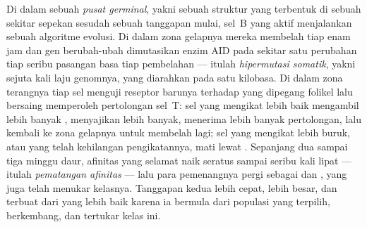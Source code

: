\begin{definition}\label{def:b3:adaptive-immunity:germinal-centre}
Di dalam sebuah \emph{pusat germinal}, yakni sebuah struktur yang terbentuk di
sebuah  sekitar sepekan sesudah sebuah tanggapan mulai, sel~B yang
aktif menjalankan sebuah algoritme evolusi. Di dalam zona gelapnya mereka
membelah tiap enam jam dan gen berubah-ubah  dimutasikan enzim AID
pada sekitar satu perubahan tiap seribu pasangan basa tiap pembelahan --- itulah
\emph{hipermutasi somatik}, yakni sejuta kali laju genomnya, yang diarahkan pada
satu kilobasa. Di dalam zona terangnya tiap sel menguji reseptor barunya
terhadap  yang dipegang  folikel lalu bersaing memperoleh
pertolongan sel~T: sel yang mengikat lebih baik mengambil lebih banyak ,
menyajikan lebih banyak, menerima lebih banyak pertolongan, lalu kembali ke zona
gelapnya untuk membelah lagi; sel yang mengikat lebih buruk, atau yang telah
kehilangan pengikatannya, mati lewat . Sepanjang dua sampai
tiga minggu daur, afinitas  yang selamat naik seratus sampai
seribu kali lipat --- itulah \emph{pematangan afinitas} --- lalu para pemenangnya
pergi sebagai  dan , yang juga telah menukar
kelasnya. Tanggapan kedua lebih cepat, lebih besar, dan terbuat dari 
yang lebih baik karena ia bermula dari populasi yang terpilih, berkembang, dan
tertukar kelas ini.
\end{definition}

